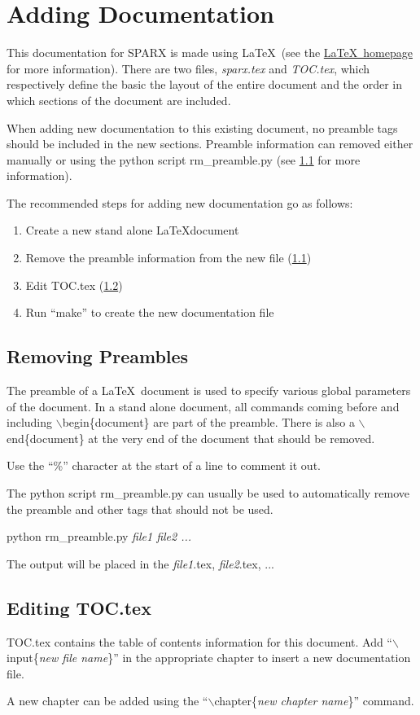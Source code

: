 \section{Adding Documentation}

This documentation for SPARX is made using \LaTeX ~(see the
\href{http://www.latex-project.org/}{\LaTeX ~homepage} for more
information).  There are two files, {\it sparx.tex} and {\it TOC.tex},
which respectively define the basic the layout of the entire document and
the order in which sections of the document are included.

When adding new documentation to this existing document, no preamble
tags should be included in the new sections.  Preamble information can
removed either manually or using the python script rm\_preamble.py 
(see \ref{ADDING-DOC-RMPRE} for more information).  

The recommended steps for adding new documentation go as follows:
\begin{enumerate}
  \item Create a new stand alone \LaTeX document
  \item Remove the preamble information from the new file
  (\ref{ADDING-DOC-RMPRE})
  \item Edit TOC.tex (\ref{ADDING-DOC-TOC})
  \item Run ``make'' to create the new documentation file
\end{enumerate}


\subsection{Removing Preambles} \label{ADDING-DOC-RMPRE}

The preamble of a \LaTeX ~document is used to specify various global
parameters of the document.  In a stand alone document, all commands
coming before and including {$\backslash$begin\{document\}} are part of the
preamble.  There is also a {$\backslash$end\{document\}} at the very end
of the document that should be removed.

Use the ``\%'' character at the  start of a line to comment it out.

The python script rm\_preamble.py can usually be used to automatically remove
the preamble and other tags that should not be used.
\begin {itemize}
  { 
  \item[\%] python rm\_preamble.py \textit{file1 file2 ...}}
\end{itemize}
The output will be placed in the \textit{file1}.tex,
\textit{file2}.tex, ...

\subsection{Editing TOC.tex} \label{ADDING-DOC-TOC}

TOC.tex contains the table of contents information for this document.
Add ``{$\backslash$input\{\textit{new file name}\}}'' in the appropriate
chapter to insert a new documentation file.

A new chapter can be added using the
``{$\backslash$chapter\{\textit{new chapter name}\}}'' command.
